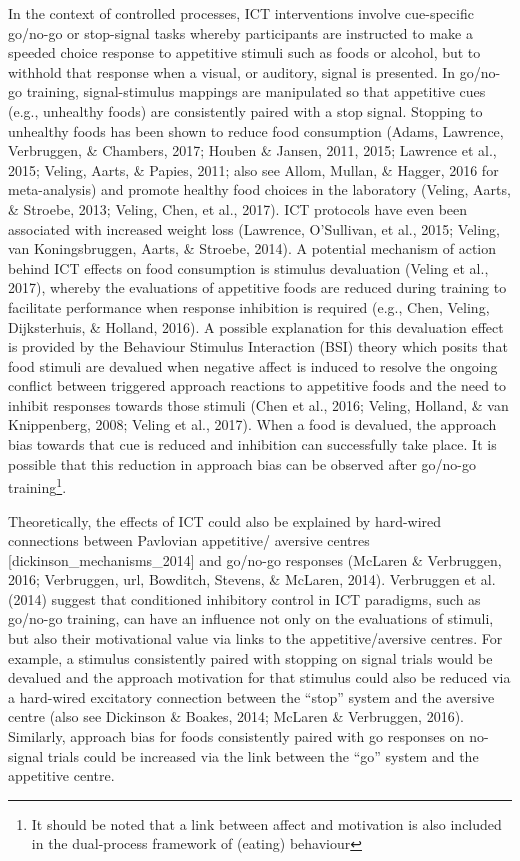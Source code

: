 \documentclass[man]{apa6}
\let\rmarkdownfootnote\footnote%
\def\footnote{\protect\rmarkdownfootnote}
\begin{document}
In the context of controlled processes, ICT interventions involve cue-specific go/no-go or stop-signal tasks whereby participants are instructed to make a speeded choice response to appetitive stimuli such as foods or alcohol, but to withhold that response when a visual, or auditory, signal is presented. In go/no-go training, signal-stimulus mappings are manipulated so that appetitive cues (e.g., unhealthy foods) are consistently paired with a stop signal. Stopping to unhealthy foods has been shown to reduce food consumption (Adams, Lawrence, Verbruggen, \& Chambers, 2017; Houben \& Jansen, 2011, 2015; Lawrence et al., 2015; Veling, Aarts, \& Papies, 2011; also see Allom, Mullan, \& Hagger, 2016 for meta-analysis) and promote healthy food choices in the laboratory (Veling, Aarts, \& Stroebe, 2013; Veling, Chen, et al., 2017). ICT protocols have even been associated with increased weight loss (Lawrence, O'Sullivan, et al., 2015; Veling, van Koningsbruggen, Aarts, \& Stroebe, 2014). A potential mechanism of action behind ICT effects on food consumption is stimulus devaluation (Veling et al., 2017), whereby the evaluations of appetitive foods are reduced during training to facilitate performance when response inhibition is required (e.g., Chen, Veling, Dijksterhuis, \& Holland, 2016). A possible explanation for this devaluation effect is provided by the Behaviour Stimulus Interaction (BSI) theory which posits that food stimuli are devalued when negative affect is induced to resolve the ongoing conflict between triggered approach reactions to appetitive foods and the need to inhibit responses towards those stimuli (Chen et al., 2016; Veling, Holland, \& van Knippenberg, 2008; Veling et al., 2017). When a food is devalued, the approach bias towards that cue is reduced and inhibition can successfully take place. It is possible that this reduction in approach bias can be observed after go/no-go training\footnote{It should be noted that a link between affect and motivation is also included in the dual-process framework of (eating) behaviour}.

\par

Theoretically, the effects of ICT could also be explained by hard-wired connections between Pavlovian appetitive/ aversive centres {[}dickinson\_mechanisms\_2014{]} and go/no-go responses (McLaren \& Verbruggen, 2016; Verbruggen, url, Bowditch, Stevens, \& McLaren, 2014). Verbruggen et al. (2014) suggest that conditioned inhibitory control in ICT paradigms, such as go/no-go training, can have an influence not only on the evaluations of stimuli, but also their motivational value via links to the appetitive/aversive centres. For example, a stimulus consistently paired with stopping on signal trials would be devalued and the approach motivation for that stimulus could also be reduced via a hard-wired excitatory connection between the \enquote{stop} system and the aversive centre (also see Dickinson \& Boakes, 2014; McLaren \& Verbruggen, 2016). Similarly, approach bias for foods consistently paired with go responses on no-signal trials could be increased via the link between the \enquote{go} system and the appetitive centre.
\end{document}

